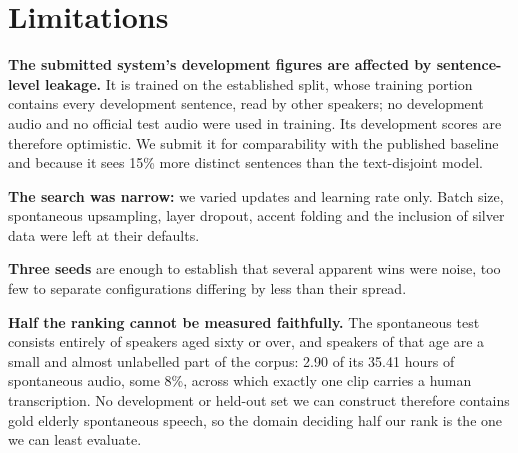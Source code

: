 \section{Limitations}
\label{sec:limitations}

\textbf{The submitted system's development figures are affected by
sentence-level leakage.} It is trained on the established split, whose training
portion contains every development sentence, read by other speakers; no
development audio and no official test audio were used in training. Its
development scores are therefore optimistic. We submit it for comparability
with the published baseline and because it sees 15\% more distinct sentences
than the text-disjoint model.

\textbf{The search was narrow:} we varied updates and learning rate only.
Batch size, spontaneous upsampling, layer dropout, accent folding and the
inclusion of silver data were left at their defaults.

\textbf{Three seeds} are enough to establish that several apparent wins were
noise, too few to separate configurations differing by less than their spread.

\textbf{Half the ranking cannot be measured faithfully.} The spontaneous test
consists entirely of speakers aged sixty or over, and speakers of that age are
a small and almost unlabelled part of the corpus: 2.90 of its 35.41 hours of
spontaneous audio, some 8\%, across which exactly one clip carries a human
transcription. No development or held-out set we can construct therefore
contains gold elderly spontaneous speech, so the domain deciding half our rank
is the one we can least evaluate.

